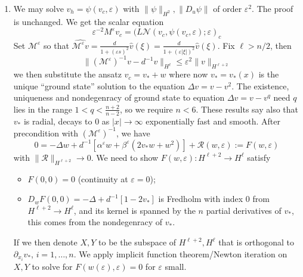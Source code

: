 \documentclass[letterpaper,11pt]{article}
\newcommand{\eps}{\varepsilon}
\newcommand{\Nl}{\mathcal{N}}
\newcommand{\M}{\mathcal{M}}
\numberwithin{equation}{section}
\theoremstyle{plain}
\theoremstyle{remark}
\begin{document}
\begin{enumerate}
\item We may solve $v_h = \psi(v_c,\eps)$ with $\|\psi\|_{H^2}, \|D_u\psi\|$ of order $\eps^2$. The proof is unchanged. We get the scalar equation
\begin{equation}
\eps^{-2}M^\eps v_c = (L\Nl(v_c,\psi(v_c,\eps);\eps)_c
\end{equation}
Set $\mathcal{M}^\eps $ so that $\widehat{\mathcal{M}^\eps v} = \frac{d}{1+(\eps s)^2}\widehat{v} (\xi) = \frac{d}{1+(\eps|\xi|)^2}\widehat{v}(\xi)$. Fix $\ell > n/2$, then 
\[
\|(\M^\eps)^{-1}v-d^{-1}v\|_{H^\ell} \le \eps^2\|v\|_{H^{\ell+2}}
\]
we then substitute the ansatz $v_c = v_* + w$ where now $v_*=v_*(x)$ is the unique ``ground state'' solution to the equation $\Delta v = v-v^2$. The existence, uniqueness and nondegenracy of ground state to equation $\Delta v = v - v^q$ need $q$ lies in the range $1<q<\frac{n+2}{n-2}$, so we require $n<6$. These results say also that $v_*$ is radial, decays to $0$ as $|x|\to \infty$ exponentially fast and smooth. After precondition with $(\M^\eps)^{-1}$, we have
\[
0 = -\Delta w+ d^{-1}[\alpha^\eps w+\beta^\eps(2v_* w+w^2)]+\mathcal{R}(w,\eps) := F(w,\eps)
\]
with $\|\mathcal{R}\|_{H^{\ell+2}} \to 0$. We need to show $F(w,\eps):H^{\ell+2} \to H^\ell$ satisfy
\begin{itemize}
\item $F(0,0) = 0$ (continuity at $\eps = 0$);
\item $D_wF(0,0) = -\Delta +d^{-1}[1-2v_*]$ is Fredholm with index $0$ from $H^{\ell+2} \to H^{\ell}$, and its kernel is spanned by the $n$ partial derivatives of $v_*$, this comes from the nondegenracy of $v_*$.
\end{itemize}
If we then denote $X,Y$ to be the subspace of $H^{\ell+2}, H^\ell$ that is orthogonal to $\partial_{x_i} v_*$, $i=1,\ldots,n$. We apply implicit function theorem/Newton iteration on $X,Y$ to solve for $F(w(\eps),\eps)=0$ for $\eps$ small.
\end{enumerate}
\end{document}
